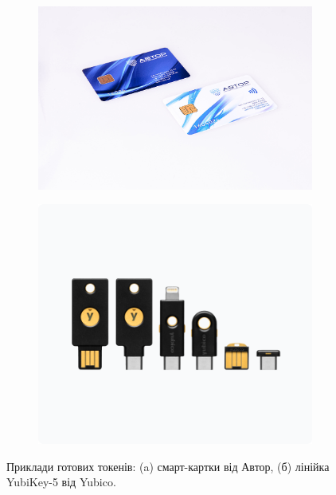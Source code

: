 \begin{figure}[ht]
\centering
    \begin{subfigure}[c]{0.5\textwidth}    
        \includegraphics[scale=0.033]{../IMAGES/avtor_smart_cards.jpg}
        \caption{}
    \end{subfigure}%
    \begin{subfigure}[c]{0.5\textwidth}
        \includegraphics[scale=0.4]{../IMAGES/YubiKey-5.png}
        \caption{}
    \end{subfigure}
 
    \caption{Приклади готових токенів: (a) смарт-картки від Автор, (б) лінійка YubiKey-5 від Yubico.}
    \label{fig_sudak}
\end{figure}


